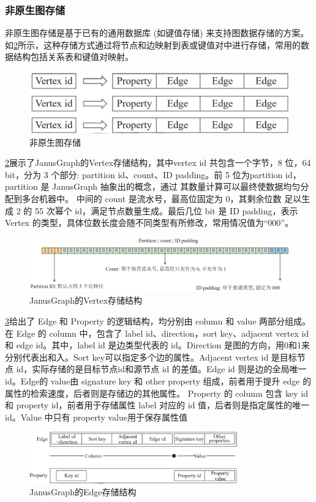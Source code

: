 \vspace{1cm}
\subsubsection{非原生图存储}

非原生图存储是基于已有的通用数据库  (如键值存储)  来支持图数据存储的方案。如\cref{fig:janusgraph-vertex}所示，这种存储方式通过将节点和边映射到表或键值对中进行存储，常用的数据结构包括关系表和键值对映射。\begin{figure}[H]
	\centering
	\includegraphics[width=\textwidth]{images/6.png}
	\caption{非原生图存储}
	\label{fig:non-native}
\end{figure}
\cref{fig:janusgraph-vertex}展示了JanusGraph的Vertex存储结构，其中vertex id 共包含一个字节，8 位，64 bit，分为  3 个部分: partition id、count、ID padding。前 5 位为partition id，partition 是 JanusGraph 抽象出的概念，通过  其数量计算可以最终使数据均匀分配到多台机器中。 中间的 count 是流水号，最高位固定为 0，其剩余位数  足以生成 2 的 55 次幂个 id，满足节点数量生成。最后几位 bit 是 ID padding，表示 Vertex 的类型，具体位数长度会随不同类型有所修改，常用情况值为“000”。\begin{figure}[H]
	\includegraphics[width=1\textwidth]{images/12.png}
	\caption{JanusGraph的Vertex存储结构}
	\label{fig:janusgraph-vertex}
\end{figure}
\cref{fig:janusgraph-edge}给出了 Edge 和 Property 的逻辑结构，均分别由 column 和 value 两部分组成。在 Edge 的 column 中，包含了 label id、direction，sort key、adjacent vertex id 和 edge id。其中，label id 是边类型代表的 id。Direction 是图的方向，用0和1来分别代表出和入。Sort key可以指定多个边的属性。Adjacent vertex id 是目标节点 id，实际存储的是目标节点id和源节点 id 的差值。Edge id 则是边的全局唯一 id。Edge的 value由 signature key 和 other property 组成，前者用于提升 edge 的属性的检索速度，后者则是存储边的其他属性。 Property 的 column 包含 key id 和 property id，前者用于存储属性 label 对应的 id 值，后者则是指定属性的唯一 id。Value 中只有 property value用于保存属性值
\begin{figure}[H]
	\centering
	\includegraphics[width=0.8\textwidth]{images/13.png}
	\caption{JanusGraph的Edge存储结构}
	\label{fig:janusgraph-edge}
\end{figure}


